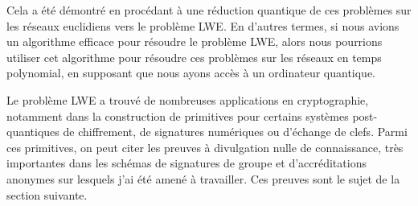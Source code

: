Cela a été démontré en procédant à une réduction quantique de ces problèmes sur les réseaux euclidiens vers le problème LWE. En d'autres termes, si nous avions un algorithme efficace pour résoudre le problème LWE, alors nous pourrions utiliser cet algorithme pour résoudre ces problèmes sur les réseaux en temps polynomial, en supposant que nous ayons accès à un ordinateur quantique.


Le problème LWE a trouvé de nombreuses applications en cryptographie, notamment dans la construction de primitives pour certains systèmes post-quantiques de chiffrement, de signatures numériques ou d’échange de clefs. Parmi ces primitives, on peut citer les preuves à divulgation nulle de connaissance, très importantes dans les schémas de signatures de groupe et d’accréditations anonymes sur lesquels j’ai été amené à travailler. Ces preuves sont le sujet de la section suivante.

